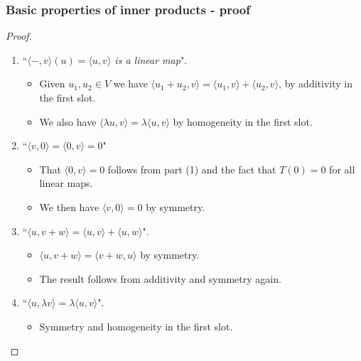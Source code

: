 \documentclass[handout]{beamer}
\begin{document}
\begin{frame}
\frametitle{Basic properties of inner products - proof}
\begin{proof}
\begin{enumerate}
\item ``\emph{$\langle -, v\rangle(u) = \langle u, v\rangle$ is a linear map}". \begin{itemize}
\item Given $u_1,u_2\in V$ we have $\langle u_1+u_2, v\rangle = \langle u_1, v\rangle + \langle u_2, v\rangle$, by additivity in the first slot. 
\item We also have $\langle \lambda u,v\rangle = \lambda \langle u, v \rangle$ by homogeneity in the first slot.
\end{itemize}\vspace{0.1cm}
\item``\emph{$\langle v, 0 \rangle = \langle 0 , v\rangle = 0$}" \begin{itemize} \item That $\langle 0 , v\rangle = 0 $ follows from part (1) and the fact that $T(0)= 0$ for all linear maps. 
\item We then have $\langle v , 0\rangle = 0$ by symmetry.
\end{itemize}\vspace{0.1cm}
\item``\emph{$\langle u, v+w\rangle = \langle u, v\rangle + \langle u, w\rangle$}". \begin{itemize} \item $\langle u, v+w\rangle = \langle v+w, u\rangle$ by symmetry. 
\item The result follows from additivity and symmetry again.\end{itemize}\vspace{0.1cm}
\item ``\emph{$\langle u,\lambda v\rangle   = \lambda\langle u,v\rangle  $}".
\begin{itemize}
\item Symmetry and homogeneity in the first slot.
\end{itemize}

\end{enumerate}
\end{proof}
\end{frame}
\end{document}

